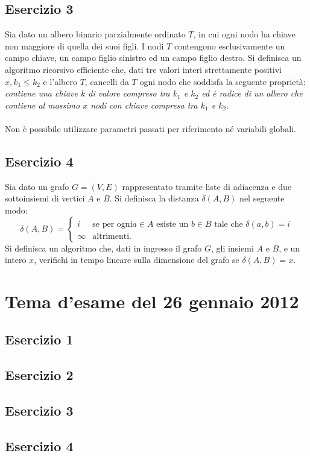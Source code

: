 \documentclass[11pt,a4paper,oneside]{article}
\begin{document}
\subsection*{Esercizio 3} Sia dato un albero binario parzialmente ordinato $T$, in cui ogni nodo ha chiave non maggiore di quella dei suoi figli. I nodi $T$ contengono esclusivamente un campo chiave, un campo figlio sinistro ed un campo figlio destro. Si definisca un algoritmo ricorsivo efficiente che, dati tre valori interi strettamente positivi $x, k_1 \leq k_2$ e l'albero $T$, cancelli da $T$ ogni nodo che soddisfa la seguente proprietà: \textit{contiene una chiave $k$ di valore compreso tra $k_1$ e $k_2$ ed è radice di un albero che contiene al massimo $x$ nodi con chiave compresa tra $k_1$ e $k_2$}.\\\\Non è possibile utilizzare parametri passati per riferimento né variabili globali.
\subsection*{Esercizio 4} Sia dato un grafo $G=(V,E)$ rappresentato tramite liste di adiacenza e due sottoinsiemi di vertici $A$ e $B$. Si definisca la distanza $\delta(A, B)$ nel seguente modo:
$$
\delta(A,B) = 
\begin{cases}
i & \text{se per ogni} a \in A \text{ esiste un } b \in B \text{ tale che } \delta(a,b) = i\\
\infty& \text{altrimenti}.
\end{cases}
$$
Si definisca un algoritmo che, dati in ingresso il grafo $G$, gli insiemi $A$ e $B$, e un intero $x$, verifichi in tempo lineare sulla dimensione del grafo se $\delta(A,B) = x$.
\pagebreak
%
%
\section*{Tema d'esame del 26 gennaio 2012}
\subsection*{Esercizio 1}
\subsection*{Esercizio 2}
\subsection*{Esercizio 3}
\subsection*{Esercizio 4}
\pagebreak
%
%
\end{document}
